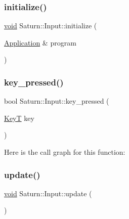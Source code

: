\mbox{\label{class_saturn_1_1_input_af711c6ae10388081b7ff5e5ee6c4b3b1}} 
\subsubsection{\texorpdfstring{initialize()}{initialize()}}
{\footnotesize\ttfamily \mbox{\hyperlink{glad_8h_a950fc91edb4504f62f1c577bf4727c29}{void}} Saturn\+::\+Input\+::initialize (\begin{DoxyParamCaption}\item[{\mbox{\hyperlink{class_saturn_1_1_application}{Application}} \&}]{program }\end{DoxyParamCaption})\hspace{0.3cm}{\ttfamily [static]}}

\mbox{\label{class_saturn_1_1_input_a9b5743eac7f0f5dd2af010abad8b0658}} 
\subsubsection{\texorpdfstring{key\+\_\+pressed()}{key\_pressed()}}
{\footnotesize\ttfamily bool Saturn\+::\+Input\+::key\+\_\+pressed (\begin{DoxyParamCaption}\item[{\mbox{\hyperlink{class_saturn_1_1_input_adb9bc8dbf6aa0a09f86efd787a96b768}{KeyT}}}]{key }\end{DoxyParamCaption})\hspace{0.3cm}{\ttfamily [static]}}

Here is the call graph for this function\+:
\mbox{\label{class_saturn_1_1_input_ae60cd4de37be05c80ee79955daeb98d0}} 
\subsubsection{\texorpdfstring{update()}{update()}}
{\footnotesize\ttfamily \mbox{\hyperlink{glad_8h_a950fc91edb4504f62f1c577bf4727c29}{void}} Saturn\+::\+Input\+::update (\begin{DoxyParamCaption}{ }\end{DoxyParamCaption})\hspace{0.3cm}{\ttfamily [static]}}

